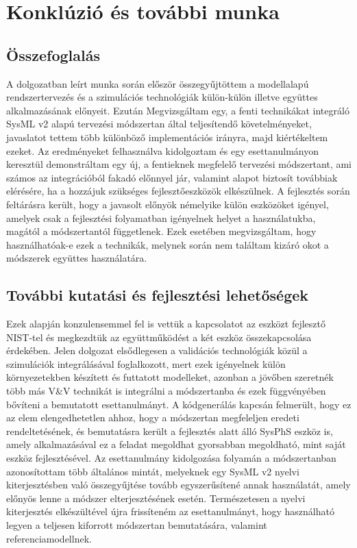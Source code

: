 \chapter{Konklúzió és további munka}

\section{Összefoglalás}
A dolgozatban leírt munka során először összegyűjtöttem a modellalapú rendszertervezés és a szimulációs technológiák külön-külön illetve együttes alkalmazásának előnyeit.
Ezután Megvizsgáltam egy, a fenti technikákat integráló SysML v2 alapú tervezési módszertan által teljesítendő követelményeket, javaslatot tettem több különböző implementációs irányra, majd kiértékeltem ezeket.
Az eredményeket felhasználva kidolgoztam és egy esettanulmányon keresztül demonstráltam egy új, a fentieknek megfelelő tervezési módszertant, ami számos az integrációból fakadó előnnyel jár, valamint alapot biztosít továbbiak elérésére, ha a hozzájuk szükséges fejlesztőeszközök elkészülnek.
A fejlesztés során feltárásra került, hogy a javasolt előnyök némelyike külön eszközöket igényel, amelyek csak a fejlesztési folyamatban igényelnek helyet a használatukba, magától a módszertantól függetlenek.
Ezek esetében megvizsgáltam, hogy használhatóak-e ezek a technikák, melynek során nem találtam kizáró okot a módszerek együttes használatára.

\section{További kutatási és fejlesztési lehetőségek}
Ezek alapján konzulensemmel fel is vettük a kapcsolatot az eszközt fejlesztő NIST-tel és megkezdtük az együttműködést a két eszköz összekapcsolása érdekében.
Jelen dolgozat elsődlegesen a validációs technológiák közül a szimulációk integrálásával foglalkozott, mert ezek igényelnek külön környezetekben készített és futtatott modelleket, azonban a jövőben szeretnék több más V\&V technikát is integrálni a módszertanba és ezek függvényében bővíteni a bemutatott esettanulmányt.
A kódgenerálás kapcsán felmerült, hogy ez az elem elengedhetetlen ahhoz, hogy a módszertan megfeleljen eredeti rendeltetésének, és bemutatásra került a fejlesztés alatt álló SysPhS eszköz is, amely alkalmazásával ez a feladat megoldhat gyorsabban megoldható, mint saját eszköz fejlesztésével.
Az esettanulmány kidolgozása folyamán a módszertanban azonosítottam több általános mintát, melyeknek egy SysML v2 nyelvi kiterjesztésben való összegyűjtése tovább egyszerűsítené annak használatát, amely előnyös lenne a módszer elterjesztésének esetén. Természetesen a nyelvi kiterjesztés elkészültével újra frissíteném az esettanulmányt, hogy használható legyen a teljesen kiforrott módszertan bemutatására, valamint referenciamodellnek.